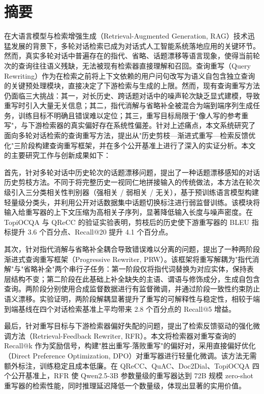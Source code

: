 \chapter{摘\quad 要}
\linespread{1.5}

在大语言模型与检索增强生成（Retrieval-Augmented Generation, RAG）技术迅猛发展的背景下，多轮对话检索已成为对话式人工智能系统落地应用的关键环节。然而，真实多轮对话中普遍存在的指代、省略、话题漂移等语言现象，使得当前轮次的查询往往语义残缺，无法被现有检索器直接理解和召回。查询重写（Query Rewriting）作为在检索之前将上下文依赖的用户问句改写为语义自包含独立查询的关键预处理模块，直接决定了下游检索与生成的上限。然而，现有查询重写方法仍面临三大挑战：其一，对长历史、跨话题对话中的噪声轮次缺乏显式建模，导致重写时引入大量无关信息；其二，指代消解与省略补全被混合为端到端序列生成任务，训练目标不明确且错误难以定位；其三，重写目标局限于"像人写的参考重写"，与下游检索器的真实偏好存在系统性偏差。针对上述痛点，本文系统研究了面向多轮对话检索的查询重写方法，提出从"历史剪枝—渐进式重写—检索反馈优化"三阶段构建查询重写框架，并在多个公开基准上进行了深入的实证分析。本文的主要研究工作与创新成果如下：

首先，针对多轮对话中历史轮次的话题漂移问题，提出了一种话题漂移感知的对话历史剪枝方法。不同于将完整历史一视同仁地拼接输入的传统做法，本方法在轮次级引入三分类相关性判别器（强相关 / 弱相关 / 无关），基于预训练语言模型构建轻量级分类头，并利用公开对话数据集中话题切换标注进行弱监督训练。该模块将输入给重写器的上下文压缩为高相关子序列，显著降低输入长度与噪声密度。在 TopiOCQA 与 QReCC 的验证实验表明，剪枝后的历史使下游重写器的 BLEU 指标提升 3.6 个百分点、Recall@20 提升 4.1 个百分点。

其次，针对指代消解与省略补全耦合导致错误难以分离的问题，提出了一种两阶段渐进式查询重写框架（Progressive Rewriter, PRW）。该框架将重写解耦为"指代消解"与"省略补全"两个串行子任务：第一阶段仅将指代词替换为对应实体，保持表层结构不变；第二阶段在此基础上补全缺失的主语、谓语与修饰成分，生成自包含查询。两阶段分别使用合成监督数据进行有监督微调，并通过阶段一致性约束防止语义漂移。实验证明，两阶段解耦显著提升了重写的可解释性与稳定性，相较于端到端基线在四个对话检索基准上平均带来 2.8 个百分点的 Recall@5 增益。

最后，针对重写目标与下游检索器偏好失配的问题，提出了检索反馈驱动的强化微调方法（Retrieval-Feedback Rewriter, RFR）。本文将检索器对重写查询的 Recall@k 作为奖励信号，构建"胜出重写-落败重写"的偏好对，采用直接偏好优化（Direct Preference Optimization, DPO）对重写器进行轻量化微调。该方法无需额外标注，训练稳定且成本低廉。在 QReCC、QuAC、Doc2Dial、TopiOCQA 四个公开基准上，RFR 使 Qwen2.5-3B 参数量级的重写器达到 72B 规模 zero-shot 重写器的检索性能，同时推理延迟降低一个数量级，体现出显著的实用价值。

